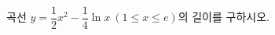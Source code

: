 \hspace*{2mm}\begin{minipage}[t]{\dimexpr\linewidth-2mm\relax}\vspace{0pt}
곡선 $y=\dfrac{1}{2}x^2-\dfrac{1}{4}\ln x\ (1\le x\le e)$의 길이를 구하시오.\end{minipage}
